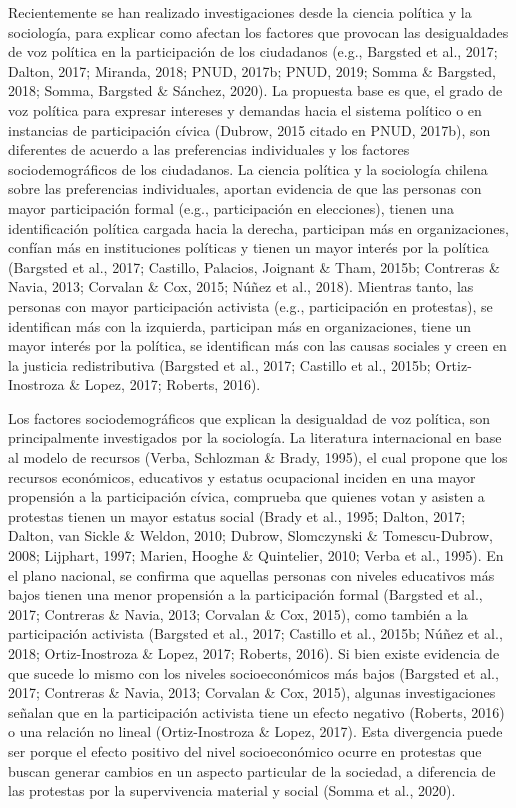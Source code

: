 \documentclass[12pt,twoside]{templates/facsothesis}
\begin{document}
Recientemente se han realizado investigaciones desde la ciencia política y la sociología, para explicar como afectan los factores que provocan las desigualdades de voz política en la participación de los ciudadanos (e.g., Bargsted et al., 2017; Dalton, 2017; Miranda, 2018; PNUD, 2017b; PNUD, 2019; Somma \& Bargsted, 2018; Somma, Bargsted \& Sánchez, 2020). La propuesta base es que, el grado de voz política para expresar intereses y demandas hacia el sistema político o en instancias de participación cívica (Dubrow, 2015 citado en PNUD, 2017b), son diferentes de acuerdo a las preferencias individuales y los factores sociodemográficos de los ciudadanos. La ciencia política y la sociología chilena sobre las preferencias individuales, aportan evidencia de que las personas con mayor participación formal (e.g., participación en elecciones), tienen una identificación política cargada hacia la derecha, participan más en organizaciones, confían más en instituciones políticas y tienen un mayor interés por la política (Bargsted et al., 2017; Castillo, Palacios, Joignant \& Tham, 2015b; Contreras \& Navia, 2013; Corvalan \& Cox, 2015; Núñez et al., 2018). Mientras tanto, las personas con mayor participación activista (e.g., participación en protestas), se identifican más con la izquierda, participan más en organizaciones, tiene un mayor interés por la política, se identifican más con las causas sociales y creen en la justicia redistributiva (Bargsted et al., 2017; Castillo et al., 2015b; Ortiz-Inostroza \& Lopez, 2017; Roberts, 2016).

Los factores sociodemográficos que explican la desigualdad de voz política, son principalmente investigados por la sociología. La literatura internacional en base al modelo de recursos (Verba, Schlozman \& Brady, 1995), el cual propone que los recursos económicos, educativos y estatus ocupacional inciden en una mayor propensión a la participación cívica, comprueba que quienes votan y asisten a protestas tienen un mayor estatus social (Brady et al., 1995; Dalton, 2017; Dalton, van Sickle \& Weldon, 2010; Dubrow, Slomczynski \& Tomescu-Dubrow, 2008; Lijphart, 1997; Marien, Hooghe \& Quintelier, 2010; Verba et al., 1995). En el plano nacional, se confirma que aquellas personas con niveles educativos más bajos tienen una menor propensión a la participación formal (Bargsted et al., 2017; Contreras \& Navia, 2013; Corvalan \& Cox, 2015), como también a la participación activista (Bargsted et al., 2017; Castillo et al., 2015b; Núñez et al., 2018; Ortiz-Inostroza \& Lopez, 2017; Roberts, 2016). Si bien existe evidencia de que sucede lo mismo con los niveles socioeconómicos más bajos (Bargsted et al., 2017; Contreras \& Navia, 2013; Corvalan \& Cox, 2015), algunas investigaciones señalan que en la participación activista tiene un efecto negativo (Roberts, 2016) o una relación no lineal (Ortiz-Inostroza \& Lopez, 2017). Esta divergencia puede ser porque el efecto positivo del nivel socioeconómico ocurre en protestas que buscan generar cambios en un aspecto particular de la sociedad, a diferencia de las protestas por la supervivencia material y social (Somma et al., 2020).
\end{document}
